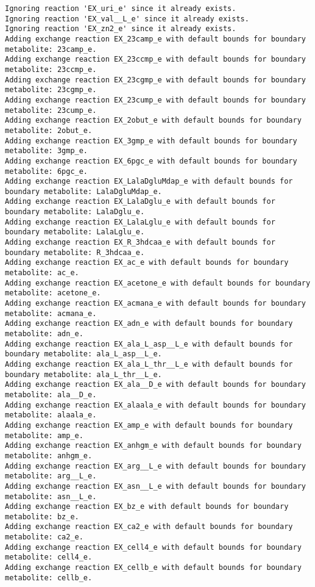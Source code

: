 \documentclass[
  letterpaper,
  DIV=11,
  numbers=noendperiod]{scrartcl}
\begin{document}
\begin{verbatim}
Ignoring reaction 'EX_uri_e' since it already exists.
Ignoring reaction 'EX_val__L_e' since it already exists.
Ignoring reaction 'EX_zn2_e' since it already exists.
Adding exchange reaction EX_23camp_e with default bounds for boundary metabolite: 23camp_e.
Adding exchange reaction EX_23ccmp_e with default bounds for boundary metabolite: 23ccmp_e.
Adding exchange reaction EX_23cgmp_e with default bounds for boundary metabolite: 23cgmp_e.
Adding exchange reaction EX_23cump_e with default bounds for boundary metabolite: 23cump_e.
Adding exchange reaction EX_2obut_e with default bounds for boundary metabolite: 2obut_e.
Adding exchange reaction EX_3gmp_e with default bounds for boundary metabolite: 3gmp_e.
Adding exchange reaction EX_6pgc_e with default bounds for boundary metabolite: 6pgc_e.
Adding exchange reaction EX_LalaDgluMdap_e with default bounds for boundary metabolite: LalaDgluMdap_e.
Adding exchange reaction EX_LalaDglu_e with default bounds for boundary metabolite: LalaDglu_e.
Adding exchange reaction EX_LalaLglu_e with default bounds for boundary metabolite: LalaLglu_e.
Adding exchange reaction EX_R_3hdcaa_e with default bounds for boundary metabolite: R_3hdcaa_e.
Adding exchange reaction EX_ac_e with default bounds for boundary metabolite: ac_e.
Adding exchange reaction EX_acetone_e with default bounds for boundary metabolite: acetone_e.
Adding exchange reaction EX_acmana_e with default bounds for boundary metabolite: acmana_e.
Adding exchange reaction EX_adn_e with default bounds for boundary metabolite: adn_e.
Adding exchange reaction EX_ala_L_asp__L_e with default bounds for boundary metabolite: ala_L_asp__L_e.
Adding exchange reaction EX_ala_L_thr__L_e with default bounds for boundary metabolite: ala_L_thr__L_e.
Adding exchange reaction EX_ala__D_e with default bounds for boundary metabolite: ala__D_e.
Adding exchange reaction EX_alaala_e with default bounds for boundary metabolite: alaala_e.
Adding exchange reaction EX_amp_e with default bounds for boundary metabolite: amp_e.
Adding exchange reaction EX_anhgm_e with default bounds for boundary metabolite: anhgm_e.
Adding exchange reaction EX_arg__L_e with default bounds for boundary metabolite: arg__L_e.
Adding exchange reaction EX_asn__L_e with default bounds for boundary metabolite: asn__L_e.
Adding exchange reaction EX_bz_e with default bounds for boundary metabolite: bz_e.
Adding exchange reaction EX_ca2_e with default bounds for boundary metabolite: ca2_e.
Adding exchange reaction EX_cell4_e with default bounds for boundary metabolite: cell4_e.
Adding exchange reaction EX_cellb_e with default bounds for boundary metabolite: cellb_e.

\end{verbatim}
\end{document}
